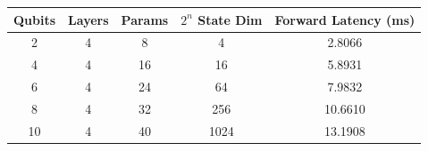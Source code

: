 \footnotesize
\setlength{\tabcolsep}{6pt}
\begin{tabular}{ccccc}
\toprule
Qubits & Layers & Params & $2^n$ State Dim & Forward Latency (ms) \\
\midrule
2 & 4 & 8 & 4 & 2.8066 \\
4 & 4 & 16 & 16 & 5.8931 \\
6 & 4 & 24 & 64 & 7.9832 \\
8 & 4 & 32 & 256 & 10.6610 \\
10 & 4 & 40 & 1024 & 13.1908 \\
\bottomrule
\end{tabular}
